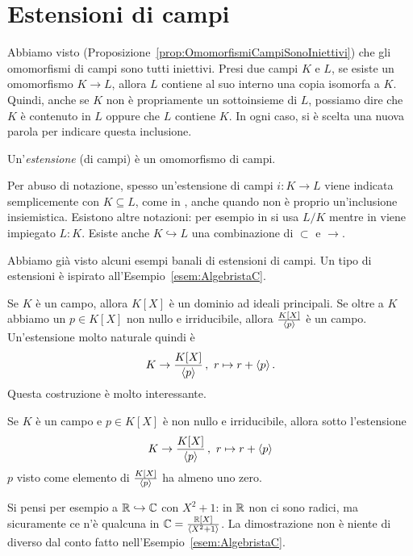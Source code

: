 
\section{Estensioni di campi}

Abbiamo visto (Proposizione~\ref{prop:OmomorfismiCampiSonoIniettivi}) che gli omomorfismi di campi sono tutti iniettivi. Presi due campi \(K\) e \(L\), se esiste un omomorfismo \(K \to L\), allora \(L\) contiene al suo interno una copia isomorfa a \(K\). Quindi, anche se \(K\) non è propriamente un sottoinsieme di \(L\), possiamo dire che \(K\) è contenuto in \(L\) oppure che \(L\) contiene \(K\). In ogni caso, si è scelta una nuova parola per indicare questa inclusione.

\begin{defi}
Un'{\em estensione} (di campi) è un omomorfismo di campi.
\end{defi}

Per abuso di notazione, spesso un'estensione di campi \(i : K \to L\) viene indicata semplicemente con \(K \subseteq L\), come in \cite{aluffi:algebra}, anche quando non è proprio un'inclusione insiemistica. Esistono altre notazioni: per esempio in \cite{milne:fields} si usa \(L/K\) mentre in \cite{leinster:fields} viene impiegato \(L:K\). Esiste anche \(K \hookrightarrow L\) una combinazione di \(\subset\) e \(\to\).

Abbiamo già visto alcuni esempi banali di estensioni di campi. Un tipo di estensioni è ispirato all'Esempio~\ref{esem:AlgebristaC}.

\begin{cons}
Se \(K\) è un campo, allora \(K[X]\) è un dominio ad ideali principali. Se oltre a \(K\) abbiamo un \(p \in K[X]\) non nullo e irriducibile, allora \(\frac{K[X]}{\left\langle p\right\rangle}\) è un campo. Un'estensione molto naturale quindi è
\[K \to \frac{K[X]}{\left\langle p\right\rangle}\,,\ r \mapsto r + \left\langle p\right\rangle .\]
Questa costruzione è molto interessante.
\end{cons}

\begin{prop}
Se \(K\) è un campo e \(p \in K[X]\) è non nullo e irriducibile, allora sotto l'estensione
\[K \to \frac{K[X]}{\left\langle p\right\rangle}\,,\ r \mapsto r + \left\langle p\right\rangle \]
\(p\) visto come elemento di \(\frac{K[X]}{\left\langle p\right\rangle}\) ha almeno uno zero.
\end{prop}

Si pensi per esempio a \(\mathbb{R} \hookrightarrow \mathbb{C}\) con \(X^2+1\): in \(\mathbb{R}\) non ci sono radici, ma sicuramente ce n'è qualcuna in \(\mathbb{C} = \frac{\mathbb{R}[X]}{\left\langle X^2+1\right\rangle}\). La dimostrazione non è niente di diverso dal conto fatto nell'Esempio~\ref{esem:AlgebristaC}.

